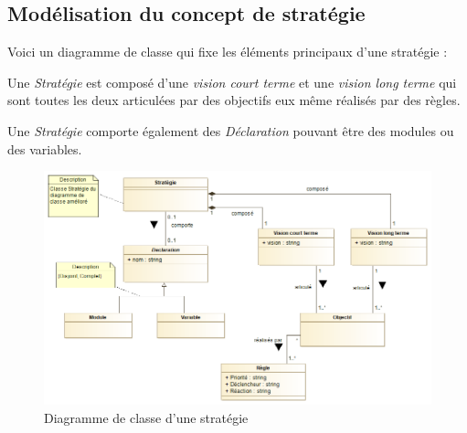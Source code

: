 
\subsection{Modélisation du concept de stratégie}
\label{sec:question7}
Voici un diagramme de classe qui fixe les éléments principaux d'une stratégie :

Une \emph{Stratégie} est composé d'une \emph{vision court terme} et une \emph{vision long terme} qui sont toutes les deux articulées par des objectifs eux même réalisés par des règles.

Une \emph{Stratégie} comporte également des \emph{Déclaration} pouvant être des modules ou des variables.

\begin{figure}
	\centering
	\includegraphics[width=500pt]{assets/strat_base}
	\caption{Diagramme de classe d'une stratégie}
	\label{fig:strategie}
\end{figure}